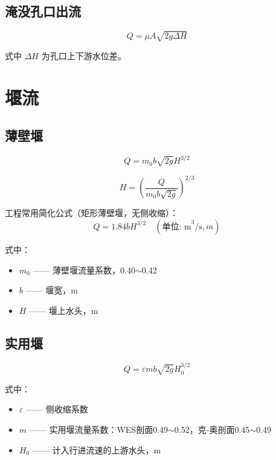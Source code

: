 \documentclass[12pt,a4paper]{ctexart}
\begin{document}
\subsection{淹没孔口出流}

\begin{equation}
    Q = \mu A \sqrt{2g \Delta H}
    \label{eq:orifice_sub}
\end{equation}

式中 $\Delta H$ 为孔口上下游水位差。

\section{堰流}

\subsection{薄壁堰}

\begin{equation}
    Q = m_0 b \sqrt{2g} H^{3/2}
    \label{eq:thin_weir}
\end{equation}

\begin{equation}
    H = \left( \frac{Q}{m_0 b \sqrt{2g}} \right)^{2/3}
    \label{eq:thin_weir_h}
\end{equation}

工程常用简化公式（矩形薄壁堰，无侧收缩）：
\begin{equation}
    Q = 1.84 b H^{3/2} \quad (\text{单位: m}^3/\text{s}, m)
    \label{eq:thin_weir_simple}
\end{equation}

式中：
\begin{itemize}[nosep]
    \item $m_0$ —— 薄壁堰流量系数，0.40$\sim$0.42
    \item $b$ —— 堰宽，m
    \item $H$ —— 堰上水头，m
\end{itemize}

\subsection{实用堰}

\begin{equation}
    Q = \varepsilon m b \sqrt{2g} H_0^{3/2}
    \label{eq:practical_weir}
\end{equation}

式中：
\begin{itemize}[nosep]
    \item $\varepsilon$ —— 侧收缩系数
    \item $m$ —— 实用堰流量系数：WES剖面0.49$\sim$0.52，克-奥剖面0.45$\sim$0.49
    \item $H_0$ —— 计入行进流速的上游水头，m
\end{itemize}
\end{document}

